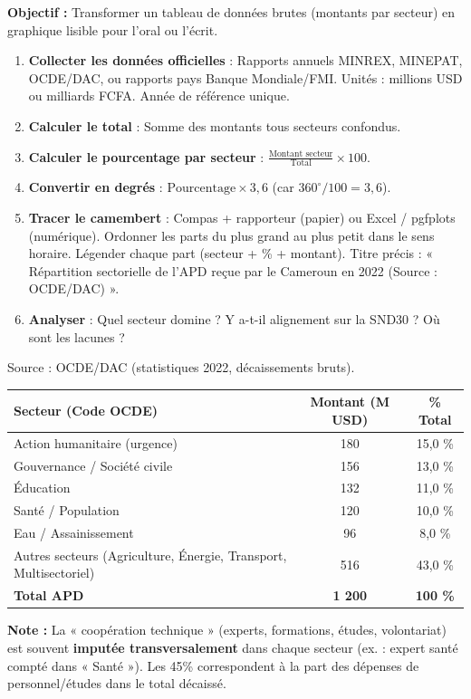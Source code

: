 \documentclass[11pt]{article}
\begin{document}
\begin{methode}
\textbf{Objectif :} Transformer un tableau de données brutes (montants par secteur) en graphique lisible pour l'oral ou l'écrit.
\begin{enumerate}
    \item \textbf{Collecter les données officielles} : Rapports annuels MINREX, MINEPAT, OCDE/DAC, ou rapports pays Banque Mondiale/FMI. Unités : millions USD ou milliards FCFA. Année de référence unique.
    \item \textbf{Calculer le total} : Somme des montants tous secteurs confondus.
    \item \textbf{Calculer le pourcentage par secteur} : $\frac{\text{Montant secteur}}{\text{Total}} \times 100$.
    \item \textbf{Convertir en degrés} : $\text{Pourcentage} \times 3,6$ (car $360^\circ / 100 = 3,6$).
    \item \textbf{Tracer le camembert} : Compas + rapporteur (papier) ou Excel / pgfplots (numérique). Ordonner les parts du plus grand au plus petit dans le sens horaire. Légender chaque part (secteur + \% + montant). Titre précis : « Répartition sectorielle de l'APD reçue par le Cameroun en 2022 (Source : OCDE/DAC) ».
    \item \textbf{Analyser} : Quel secteur domine ? Y a-t-il alignement sur la SND30 ? Où sont les lacunes ?
\end{enumerate}
\end{methode}

\begin{exemplebox}
Source : OCDE/DAC (statistiques 2022, décaissements bruts).
\begin{center}
\begin{tabular}{|l|c|c|}\hline
\rowcolor{popblueL}
\textbf{Secteur (Code OCDE)} & \textbf{Montant (M USD)} & \textbf{\% Total} \\ \hline
Action humanitaire (urgence) & 180 & 15,0 \% \\ \hline
Gouvernance / Société civile & 156 & 13,0 \% \\ \hline
Éducation & 132 & 11,0 \% \\ \hline
Santé / Population & 120 & 10,0 \% \\ \hline
Eau / Assainissement & 96 & 8,0 \% \\ \hline
Autres secteurs (Agriculture, Énergie, Transport, Multisectoriel) & 516 & 43,0 \% \\ \hline
\textbf{Total APD} & \textbf{1 200} & \textbf{100 \%} \\ \hline
\end{tabular}
\end{center}
\textbf{Note :} La « coopération technique » (experts, formations, études, volontariat) est souvent \textbf{imputée transversalement} dans chaque secteur (ex. : expert santé compté dans « Santé »). Les 45\% correspondent à la part des dépenses de personnel/études dans le total décaissé.
\end{exemplebox}
\end{document}

